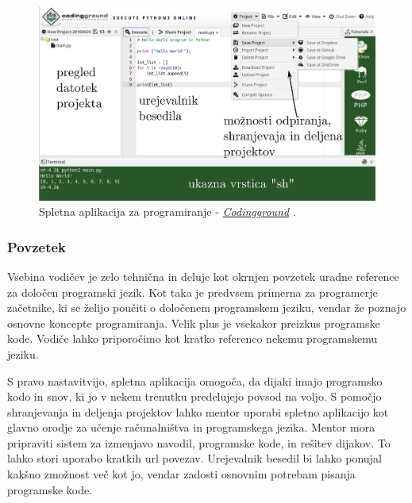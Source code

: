\begin{figure}[h!]
  \centering
    \includegraphics [width=0.65\linewidth, keepaspectratio =
   1] {./images/sc_web/tutpoint_cg-v01.png}
   \caption{Spletna aplikacija za programiranje -
     \emph{\href{http://www.tutorialspoint.com/codingground.htm}{Codingground}}
     \cite{web:tutorialspoint:codingground}.}
    \label{fig:web:tutpoint:cg}
\end{figure}

\subsubsection{Povzetek}
\label{sec:povzetek_tutpoint}

Vsebina vodičev je zelo tehnična in deluje kot okrnjen povzetek uradne
reference za določen programski jezik. Kot taka je predvsem primerna
za programerje začetnike, ki se želijo poučiti o določenem programskem
jeziku, vendar že poznajo osnovne koncepte programiranja. Velik plus
je vsekakor preizkus programske kode. Vodiče lahko priporočimo kot
kratko referenco nekemu programskemu jeziku.

S pravo nastavitvijo, spletna aplikacija omogoča, da dijaki imajo
programsko kodo in snov, ki jo v nekem trenutku predelujejo povsod na
voljo. S pomočjo shranjevanja in deljenja projektov lahko mentor
uporabi spletno aplikacijo kot glavno orodje za učenje računalništva
in programskega jezika. Mentor mora pripraviti sistem za izmenjavo
navodil, programske kode, in rešitev dijakov. To lahko stori uporabo
kratkih url povezav. Urejevalnik besedil bi lahko ponujal kakšno
zmožnost več kot jo, vendar zadosti osnovnim potrebam pisanja
programske kode.


